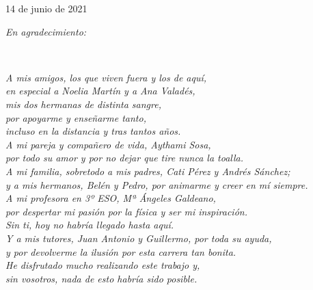 \begin{titlepage}

{\large 14 de junio de 2021}\\[2cm] %



\vfill %

\end{titlepage}

\newpage

\begin{flushleft}
\vspace*{4cm} %

\emph{En agradecimiento:}

\end{flushleft}
~
\begin{flushright}
\vspace{1cm} %

\small
\emph{A mis amigos, los que viven fuera y los de aquí, }\\
\emph{en especial a Noelia Martín y a Ana Valadés,}\\
\emph{mis dos hermanas de distinta sangre,}\\
\emph{por apoyarme y enseñarme tanto,}\\
\emph{incluso en la distancia y tras tantos años.}\\[1cm]

\emph{A mi pareja y compañero de vida, Aythami Sosa,}\\
\emph{por todo su amor y por no dejar que tire nunca la toalla.}\\[1cm]

\emph{A mi familia, sobretodo a mis padres, Cati Pérez y Andrés Sánchez; }\\
\emph{y a mis hermanos, Belén y Pedro, por animarme y creer en mí siempre.}\\[1cm]

\emph{A mi profesora en 3º ESO, Mª Ángeles Galdeano,}\\
\emph{por despertar mi pasión por la física y ser mi inspiración.} \\
\emph{Sin ti, hoy no habría llegado hasta aquí.}\\[1cm]

\emph{Y a mis tutores, Juan Antonio y Guillermo, por toda su ayuda,}\\
\emph{y por devolverme la ilusión por esta carrera tan bonita.}\\
\emph{He disfrutado mucho realizando este trabajo y,}\\
\emph{sin vosotros, nada de esto habría sido posible.}\\
\end{flushright}

\vfill


\thispagestyle{empty}
